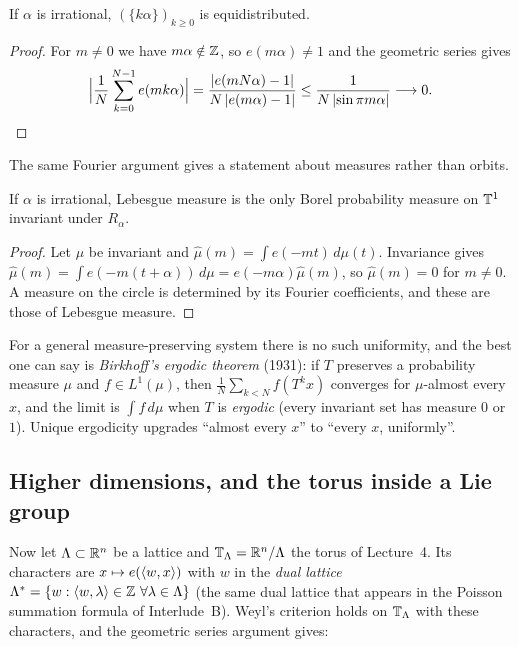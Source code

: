 \begin{theorem}\label{ERG:thm:weyl}
If $\alpha$ is irrational, $(\{k\alpha\})_{k\ge0}$ is equidistributed.
\end{theorem}

\begin{proof}
For $m\neq0$ we have $m\alpha\notin\mathbb{Z}$, so $e(m\alpha)\neq1$ and the geometric series gives
\[
  \Big|\frac1N\sum_{k=0}^{N-1}e(mk\alpha)\Big|
  =\frac{\left\lvert e(mN\alpha)-1 \right\rvert}{N\left\lvert e(m\alpha)-1 \right\rvert}\le\frac{1}{N\left\lvert \sin\pi m\alpha \right\rvert}\longrightarrow0 .
  \qedhere
\]
\end{proof}

The same Fourier argument gives a statement about measures rather than orbits.

\begin{proposition}\label{ERG:prop:ue}
If $\alpha$ is irrational, Lebesgue measure is the only Borel probability measure on $\mathbb{T}^1$ invariant
under $R_\alpha$.
\end{proposition}

\begin{proof}
Let $\mu$ be invariant and $\hat\mu(m)=\int e(-mt)\,d\mu(t)$. Invariance gives
$\hat\mu(m)=\int e(-m(t+\alpha))\,d\mu=e(-m\alpha)\hat\mu(m)$, so $\hat\mu(m)=0$ for $m\neq0$. A
measure on the circle is determined by its Fourier coefficients, and these are those of Lebesgue measure.
\end{proof}

For a general measure-preserving system there is no such uniformity, and the best one can say is
\emph{Birkhoff's ergodic theorem} (1931): if $T$ preserves a probability measure $\mu$ and
$f\in L^1(\mu)$, then $\frac1N\sum_{k<N}f(T^kx)$ converges for $\mu$-almost every $x$, and the limit is
$\int f\,d\mu$ when $T$ is \emph{ergodic} (every invariant set has measure $0$ or $1$). Unique
ergodicity upgrades ``almost every $x$'' to ``every $x$, uniformly''.

\subsection*{Higher dimensions, and the torus inside a Lie group}

Now let $\Lambda\subset\mathbb{R}^n$ be a lattice and $\mathbb{T}_\Lambda=\mathbb{R}^n/\Lambda$ the torus of Lecture~4. Its
characters are $x\mapsto e(\langle w, x\rangle)$ with $w$ in the \emph{dual lattice}
$\Lat^*=\{w:\ip{w}{\lambda}\in\Z\ \forall\lambda\in\Lat\}$ (the same dual lattice that appears in the
Poisson summation formula of Interlude~B). Weyl's criterion holds on $\mathbb{T}_\Lambda$ with these characters, and
the geometric series argument gives:

